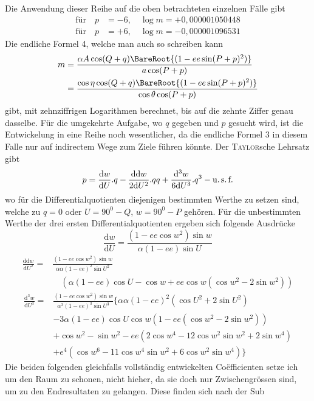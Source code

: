 %
\noindent Die Anwendung dieser Reihe auf die oben betrachteten einzelnen Fälle gibt
\[
\begin{aligned}
\text{für}\quad p&=-6,\quad\log m=+0{,}000001050448\\
\text{für}\quad p&=+6,\quad\log m=-0{,}000001096531
\end{aligned}
\]
Die endliche Formel 4, welche man auch so schreiben kann
\[
\begin{aligned}
m&=\frac{\alpha A\cos(Q+q)\BareRoot{(1-ee\sin(P+p)^2)}}{a\cos(P+p)}\\
&=\frac{\cos\eta\cos(Q+q)\BareRoot{(1-ee\sin(P+p)^2)}}{\cos\theta\cos(P+p)}
\end{aligned}
\]
gibt, mit zehnziffrigen Logarithmen berechnet, bis auf die zehnte Ziffer genau dasselbe.
\indent Für die umgekehrte Aufgabe, wo \(q\) gegeben und \(p\) gesucht wird, ist die Entwickelung in eine Reihe noch wesentlicher, da die endliche Formel 3 in diesem Falle nur auf indirectem Wege zum Ziele führen könnte. Der \textsc{Taylor}sche Lehrsatz gibt
\[
p=\frac{\mathrm{d}w}{\mathrm{d}U}\mathord{.}q-\frac{\mathrm{dd}w}{2\mathrm{d}U^2}\mathord{.}qq+\frac{\mathrm{d}^3w}{6\mathrm{d}U^3}\mathord{.}q^3-\text{u.\,s.\,f.}
\]
wo für die Differentialquotienten diejenigen bestimmten Werthe zu setzen sind, welche zu \(q=0\) oder \(U=90^0-Q\), \(w=90^0-P\) gehören. Für die unbestimmten Werthe der drei ersten Differentialquotienten ergeben sich folgende Ausdrücke
\[
\frac{\mathrm{d}w}{\mathrm{d}U}=\frac{(1-ee\cos w^2)\sin w}{\alpha(1-ee)\sin U}
\]
\[
\begin{aligned}
\frac{\mathrm{dd}w}{\mathrm{d}U^2}={}&\frac{(1-ee\cos w^2)\sin w}{\alpha\alpha(1-ee)^2\sin U^2}\\
&\quad(\alpha(1-ee)\cos U-\cos w+ee\cos w(\cos w^2-2\sin w^2))
\end{aligned}
\]
\[
\begin{aligned}
\frac{\mathrm{d}^3w}{\mathrm{d}U^3}={}&\frac{(1-ee\cos w^2)\sin w}{\alpha^3(1-ee)^3\sin U^3}\{\alpha\alpha(1-ee)^2(\cos U^2+2\sin U^2)\\
&-3\alpha(1-ee)\cos U\cos w(1-ee(\cos w^2-2\sin w^2))\\
&+\cos w^2-\sin w^2-ee(2\cos w^4-12\cos w^2\sin w^2+2\sin w^4)\\
&+e^4(\cos w^6-11\cos w^4\sin w^2+6\cos w^2\sin w^4)\}
\end{aligned}
\]
\indent Die beiden folgenden gleichfalls vollständig entwickelten Coëfficienten setze ich um den Raum zu schonen, nicht hieher, da sie doch nur Zwischengrössen sind, um zu den Endresultaten zu gelangen. Diese finden sich nach der Sub%

